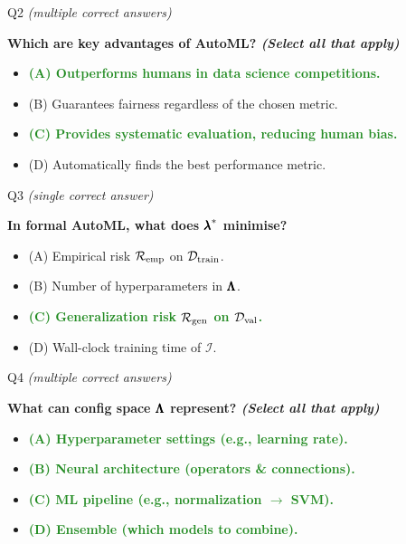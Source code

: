 \documentclass[main]{subfiles}
\newcommand{\correct}[1]{\textcolor{ForestGreen}{\textbf{#1} \checkmark}}
\newcommand{\wrong}[1]{#1}
\begin{document}
\begin{frame}{Q2 \hfill \small\normalfont\textit{(multiple correct answers)}}

\textbf{Which are key advantages of AutoML? \textit{(Select all that apply)}}

\begin{itemize}
    \item \correct{(A) \; Outperforms humans in data science competitions.}
    \item \wrong{(B) \; Guarantees fairness regardless of the chosen metric.}
    \item \correct{(C) \; Provides systematic evaluation, reducing human bias.}
    \item \wrong{(D) \; Automatically finds the best performance metric.}
\end{itemize}

\end{frame}

\begin{frame}{Q3 \hfill \small\normalfont\textit{(single correct answer)}}

\textbf{In formal AutoML, what does ${\pmb{\lambda}}^*$ minimise?}

\begin{itemize}
    \item \wrong{(A) \; Empirical risk $\mathcal{R}_{\text{emp}}$ on $\mathcal{D}_{\text{train}}$.}
    \item \wrong{(B) \; Number of hyperparameters in $\pmb{\Lambda}$.}
    \item \correct{(C) \; Generalization risk $\mathcal{R}_{\text{gen}}$ on $\mathcal{D}_{\text{val}}$.}
    \item \wrong{(D) \; Wall-clock training time of $\mathcal{I}$.}
\end{itemize}

\end{frame}

\begin{frame}{Q4 \hfill \small\normalfont\textit{(multiple correct answers)}}

\textbf{What can config space $\pmb{\Lambda}$ represent? \textit{(Select all that apply)}}

\begin{itemize}
    \item \correct{(A) \; Hyperparameter settings (e.g., learning rate).}
    \item \correct{(B) \; Neural architecture (operators \& connections).}
    \item \correct{(C) \; ML pipeline (e.g., normalization $\to$ SVM).}
    \item \correct{(D) \; Ensemble (which models to combine).}
\end{itemize}

\end{frame}
\end{document}

